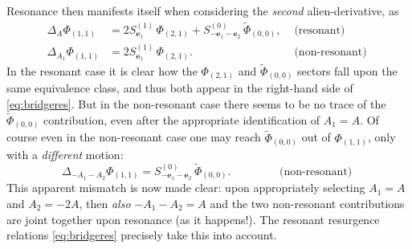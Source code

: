 \documentclass[11pt,a4paper]{article}
\newcommand{\be}{\begin{equation}}
\newcommand{\ee}{\end{equation}}
\begin{document}
%
\noindent
Resonance then manifests itself when considering the \textit{second} alien-derivative, as
%
\begin{align}
\label{DA11reso}
\Delta_A \Phi_{(1,1)} &= 2 S^{(1)}_{\boldsymbol{e}_1}\, \Phi_{(2,1)} + S^{(0)}_{-\boldsymbol{e}_1-\boldsymbol{e}_2}\, \widetilde{\Phi}_{(0,0)}, &\text{ (resonant) } \\
\Delta_{A_1} \Phi_{(1,1)} &= 2 S^{(1)}_{\boldsymbol{e}_1}\, \Phi_{(2,1)}. &\text{ (non-resonant) }
\end{align}
%
\noindent
In the resonant case it is clear how the $\Phi_{(2,1)}$ and $\widetilde{\Phi}_{(0,0)}$ sectors fall upon the same equivalence class, and thus both appear in the right-hand side of \eqref{eq:bridgeres}. But in the non-resonant case there seems to be no trace of the $\widetilde{\Phi}_{(0,0)}$ contribution, even after the appropriate identification of $A_1 = A$. Of course even in the non-resonant case one may reach $\widetilde{\Phi}_{(0,0)}$ out of $\Phi_{(1,1)}$, only with a \textit{different} motion:
%
\be
\label{D-A1-A211nonreso}
\Delta_{-A_1-A_2} \Phi_{(1,1)} = S^{(0)}_{-\boldsymbol{e}_1-\boldsymbol{e}_2}\, \widetilde{\Phi}_{(0,0)}. \qquad\qquad \text{ (non-resonant) }
\ee
%
\noindent
This apparent mismatch is now made clear: upon appropriately selecting $A_1=A$ and $A_2=-2A$, then \textit{also} $-A_1-A_2=A$ and the two non-resonant contributions are joint together upon resonance (as it happens!). The resonant resurgence relations \eqref{eq:bridgeres} precisely take this into account.
\end{document}
